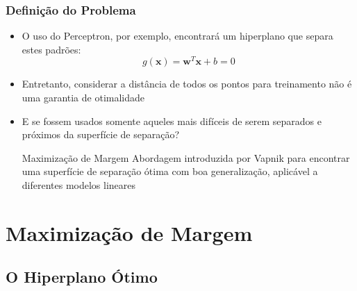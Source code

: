 \documentclass{beamer}
\begin{document}
\begin{frame}
	\frametitle{Definição do Problema}
	\begin{itemize}
		\item O uso do Perceptron, por exemplo, encontrará um hiperplano que separa estes padrões:
		\begin{equation}
	 		g(\textbf{x}) = \textbf{w}^T\textbf{x} + b = 0
	 		\label{eq:plano}
 		\end{equation}
 		\item Entretanto, considerar a distância de todos os pontos para treinamento não é uma garantia de otimalidade
		\item E se fossem usados somente aqueles mais difíceis de serem separados e próximos da superfície de separação?
		
		\begin{block}{Maximização de Margem}
			Abordagem introduzida por Vapnik \cite{vapnik} para encontrar uma superfície de separação ótima com boa generalização, aplicável a diferentes modelos lineares
		\end{block}		

	\end{itemize}

\end{frame}

\section{Maximização de Margem}

\subsection{O Hiperplano Ótimo}
\end{document}
